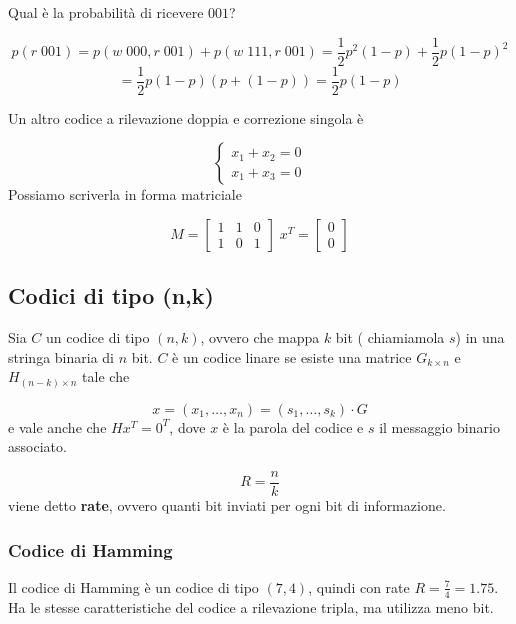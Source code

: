 \documentclass[12pt]{report}
\begin{document}
    \begin{es}
        Qual è la probabilità di ricevere $001$?

        $$p(r \; 001) = p(w\; 000, r\; 001) + p(w\; 111, r\; 001) = \frac{1}{2} p^2 (1-p) + \frac{1}{2} p (1-p)^2$$
        $$= \frac{1}{2} p (1-p) (p + (1-p)) = \frac{1}{2} p (1-p)$$
    \end{es}

    \noindent
    Un altro codice a rilevazione doppia e correzione singola è

    $$\begin{cases} x_1 + x_2 = 0\\
    x_1 + x_3 = 0 \end{cases}$$
    Possiamo scriverla in forma matriciale

    \[
        M = \begin{bmatrix}
                1 & 1 & 0 \\
                1 & 0 & 1
        \end{bmatrix}
        \; x^T = \begin{bmatrix}
                     0 \\
                     0
        \end{bmatrix} \]

    \subsection{Codici di tipo (n,k)}

    Sia $C$  un codice di tipo $(n,k)$, ovvero che mappa $k$ bit ( chiamiamola $s$) in una stringa binaria di $n$ bit.
    $C$ è un codice linare se esiste una matrice $G_{k\times n}$ e $H_{(n-k) \times n}$ tale che

    $$x = (x_1,\dots,x_n) = (s_1,\dots,s_k) \cdot G$$
    e vale anche che $H x^T = 0^T$, dove $x$ è la parola del codice e $s$ il messaggio binario associato.

    \begin{defi}
        $$R = \frac{n}{k}$$
        viene detto \textbf{rate}, ovvero quanti bit inviati per ogni bit di informazione.
    \end{defi}

    \subsubsection{Codice di Hamming}
    Il codice di Hamming è un codice di tipo $(7,4)$, quindi con rate $R = \frac{7}{4} = 1.75$. Ha le stesse caratteristiche del codice a rilevazione tripla, ma utilizza meno bit.
\end{document}
